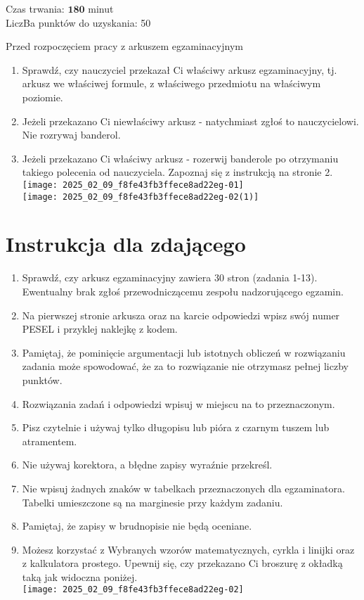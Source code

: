 \documentclass[10pt]{article}
\begin{document}
Czas trwania: \(\mathbf{1 8 0}\) minut\\
LiczBa punktów do uzyskania: 50

Przed rozpoczęciem pracy z arkuszem egzaminacyjnym

\begin{enumerate}
  \item Sprawdź, czy nauczyciel przekazał Ci właściwy arkusz egzaminacyjny, tj. arkusz we właściwej formule, z właściwego przedmiotu na właściwym poziomie.
  \item Jeżeli przekazano Ci niewłaściwy arkusz - natychmiast zgłoś to nauczycielowi. Nie rozrywaj banderol.
  \item Jeżeli przekazano Ci właściwy arkusz - rozerwij banderole po otrzymaniu takiego polecenia od nauczyciela. Zapoznaj się z instrukcją na stronie 2.\\
\texttt{[image: 2025\_02\_09\_f8fe43fb3ffece8ad22eg-01]}\\
\texttt{[image: 2025\_02\_09\_f8fe43fb3ffece8ad22eg-02(1)]}
\end{enumerate}

\section*{Instrukcja dla zdającego}
\begin{enumerate}
  \item Sprawdź, czy arkusz egzaminacyjny zawiera 30 stron (zadania 1-13). Ewentualny brak zgłoś przewodniczącemu zespołu nadzorującego egzamin.
  \item Na pierwszej stronie arkusza oraz na karcie odpowiedzi wpisz swój numer PESEL i przyklej naklejkę z kodem.
  \item Pamiętaj, że pominięcie argumentacji lub istotnych obliczeń w rozwiązaniu zadania może spowodować, że za to rozwiązanie nie otrzymasz pełnej liczby punktów.
  \item Rozwiązania zadań i odpowiedzi wpisuj w miejscu na to przeznaczonym.
  \item Pisz czytelnie i używaj tylko długopisu lub pióra z czarnym tuszem lub atramentem.
  \item Nie używaj korektora, a błędne zapisy wyraźnie przekreśl.
  \item Nie wpisuj żadnych znaków w tabelkach przeznaczonych dla egzaminatora. Tabelki umieszczone są na marginesie przy każdym zadaniu.
  \item Pamiętaj, że zapisy w brudnopisie nie będą oceniane.
  \item Możesz korzystać z Wybranych wzorów matematycznych, cyrkla i linijki oraz z kalkulatora prostego. Upewnij się, czy przekazano Ci broszurę z okładką taką jak widoczna poniżej.\\
\texttt{[image: 2025\_02\_09\_f8fe43fb3ffece8ad22eg-02]}
\end{enumerate}
\end{document}
